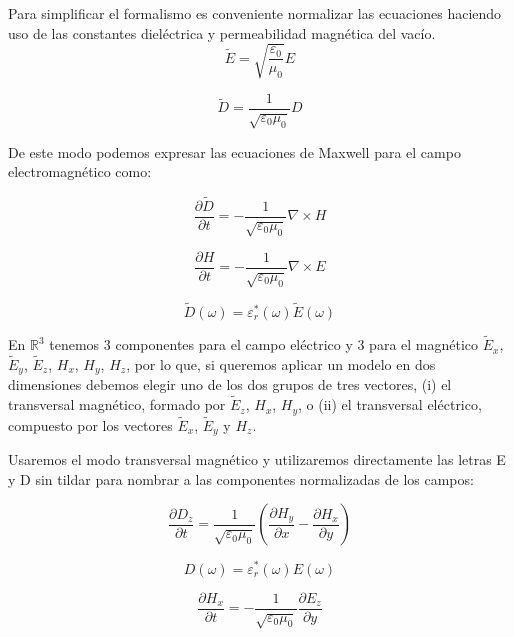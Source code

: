 \documentclass[11pt,a4paper,twoside,pdf]{article}
\numberwithin{equation}{section}
\begin{document}
Para simplificar el formalismo es conveniente normalizar las ecuaciones haciendo uso de las constantes dieléctrica y permeabilidad magnética del vacío.
\begin{equation}
\tilde{E}=\sqrt{\frac{\varepsilon_{0}}{\mu_{0}}}E
\end{equation}

\begin{equation}
\tilde{D}=\frac{1}{\sqrt{\varepsilon_{0}\mu_{0}}}D
\end{equation}

De este modo podemos expresar las ecuaciones de Maxwell para el campo electromagnético como:

\begin{equation}
\frac{\partial \tilde{D}}{\partial t}=-\frac{1}{\sqrt{\varepsilon_{0}\mu_{0}}}\nabla \times H
\end{equation}

\begin{equation}
\frac{\partial H}{\partial t}=-\frac{1}{\sqrt{\varepsilon_{0}\mu_{0}}}\nabla \times E
\end{equation}

\begin{equation}
\tilde{D}(\omega)=\varepsilon^*_{r}(\omega)\tilde{E}(\omega)
\end{equation}


En $\mathbb R^{3}$ tenemos 3 componentes para el campo eléctrico y 3 para el magnético $\tilde{E}_{x}$, $\tilde{E}_{y}$, $\tilde{E}_{z}$, $H_{x}$, $H_{y}$, $H_{z}$, por lo que, si queremos aplicar un modelo en dos dimensiones debemos elegir uno de los dos grupos de tres vectores, (i) el transversal magnético, formado por $\tilde{E}_{z}$, $H_{x}$, $H_{y}$, o (ii) el transversal eléctrico, compuesto por los vectores $\tilde{E}_{x}$, $\tilde{E}_{y}$ y $H_{z}$.

Usaremos el modo transversal magnético y utilizaremos directamente las letras E y D sin tildar para nombrar a las componentes normalizadas de los campos:

\begin{equation}
\frac{\partial D_{z}}{\partial t}=\frac{1}{\sqrt{\varepsilon_{0}\mu_{0}}}(\frac{\partial H_{y}}{\partial x}-\frac{\partial H_{x}}{\partial y})
\end{equation}

\begin{equation}
{D}(\omega)=\varepsilon^*_{r}(\omega)E(\omega)
\end{equation}

\begin{equation}
\frac{\partial H_{x}}{\partial t}=-\frac{1}{\sqrt{\varepsilon_{0}\mu_{0}}}\frac{\partial E_{z}}{\partial y}
\end{equation}
\end{document}
